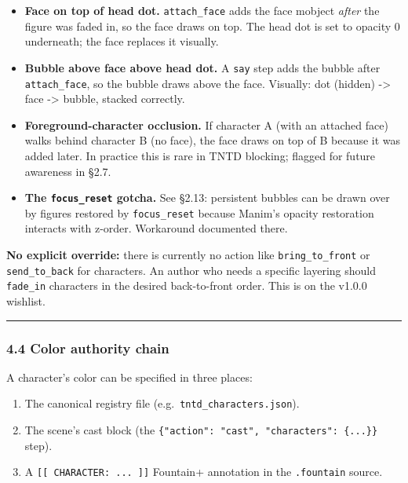 \documentclass[
  11pt,
]{book}
\providecommand{\tightlist}{%
  \setlength{\itemsep}{0pt}\setlength{\parskip}{0pt}}
\begin{document}
\begin{itemize}
\tightlist
\item
  \textbf{Face on top of head dot.} \texttt{attach\_face} adds the face
  mobject \emph{after} the figure was faded in, so the face draws on
  top. The head dot is set to opacity 0 underneath; the face replaces it
  visually.
\item
  \textbf{Bubble above face above head dot.} A \texttt{say} step adds
  the bubble after \texttt{attach\_face}, so the bubble draws above the
  face. Visually: dot (hidden) -\textgreater{} face -\textgreater{}
  bubble, stacked correctly.
\item
  \textbf{Foreground-character occlusion.} If character A (with an
  attached face) walks behind character B (no face), the face draws on
  top of B because it was added later. In practice this is rare in TNTD
  blocking; flagged for future awareness in §2.7.
\item
  \textbf{The \texttt{focus\_reset} gotcha.} See §2.13: persistent
  bubbles can be drawn over by figures restored by \texttt{focus\_reset}
  because Manim's opacity restoration interacts with z-order. Workaround
  documented there.
\end{itemize}

\textbf{No explicit override:} there is currently no action like
\texttt{bring\_to\_front} or \texttt{send\_to\_back} for characters. An
author who needs a specific layering should \texttt{fade\_in} characters
in the desired back-to-front order. This is on the v1.0.0 wishlist.

\begin{center}\rule{0.5\linewidth}{0.5pt}\end{center}

\subsubsection{4.4 Color authority chain}\label{color-authority-chain}

A character's color can be specified in three places:

\begin{enumerate}
\def\labelenumi{\arabic{enumi}.}
\tightlist
\item
  The canonical registry file (e.g.~\texttt{tntd\_characters.json}).
\item
  The scene's cast block (the
  \texttt{\{"action":\ "cast",\ "characters":\ \{...\}\}} step).
\item
  A \texttt{{[}{[}\ CHARACTER:\ ...\ {]}{]}} Fountain+ annotation in the
  \texttt{.fountain} source.
\end{enumerate}
\end{document}
